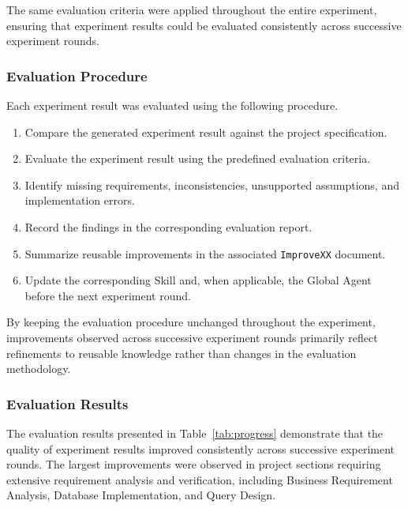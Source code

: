 The same evaluation criteria were applied throughout the entire experiment, ensuring that experiment results could be evaluated consistently across successive experiment rounds.

\subsubsection{Evaluation Procedure}

Each experiment result was evaluated using the following procedure.

\begin{enumerate}

\item Compare the generated experiment result against the project specification.

\item Evaluate the experiment result using the predefined evaluation criteria.

\item Identify missing requirements, inconsistencies, unsupported assumptions, and implementation errors.

\item Record the findings in the corresponding evaluation report.

\item Summarize reusable improvements in the associated \texttt{ImproveXX} document.

\item Update the corresponding Skill and, when applicable, the Global Agent before the next experiment round.

\end{enumerate}

By keeping the evaluation procedure unchanged throughout the experiment, improvements observed across successive experiment rounds primarily reflect refinements to reusable knowledge rather than changes in the evaluation methodology.

\subsubsection{Evaluation Results}

The evaluation results presented in Table~\ref{tab:progress} demonstrate that the quality of experiment results improved consistently across successive experiment rounds. The largest improvements were observed in project sections requiring extensive requirement analysis and verification, including Business Requirement Analysis, Database Implementation, and Query Design.

